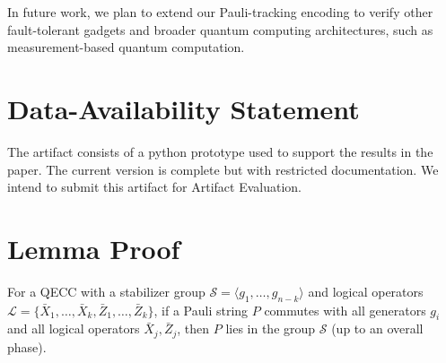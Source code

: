\documentclass[acmsmall,screen,review,anonymous,nonacm]{acmart}
\newcommand{\cy}[1]{}
\begin{document}
In future work, we plan to extend our Pauli-tracking encoding to verify other fault-tolerant gadgets and broader quantum computing architectures, such as measurement-based quantum computation.


\section*{Data-Availability Statement}
The artifact consists of a python prototype used to support the results in the paper. The current version is complete but with restricted documentation. We intend to submit this artifact for Artifact Evaluation.




\clearpage
 


\clearpage
\appendix

\section{Lemma Proof}
\begin{lemma}
For a QECC with a stabilizer group $\mathcal{S} = \langle g_1, \dots, g_{n-k} \rangle$ and logical operators $\mathcal{L} = \{\bar{X}_1, \dots, \bar{X}_k, \bar{Z}_1, \dots, \bar{Z}_k\}$, if a Pauli string $P$ commutes with all generators $g_i$ and all logical operators $\bar{X}_j, \bar{Z}_j$, then $P$ lies in the group $\mathcal{S}$ (up to an overall phase).
\end{lemma}
\end{document}

